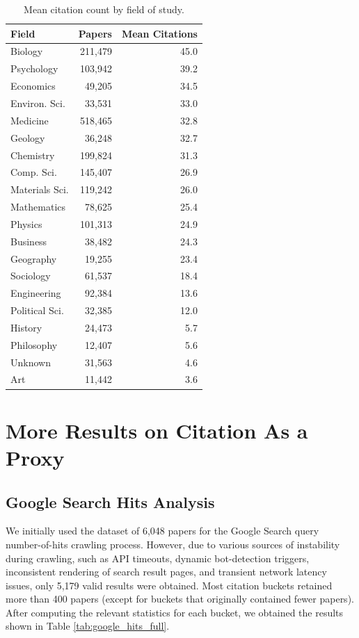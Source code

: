 \documentclass[11pt]{article}
\begin{document}
\begin{table}[htbp]
\centering

\begin{tabular}{@{}lrr@{}}
\toprule
\textbf{Field} & \textbf{Papers} & \textbf{Mean Citations} \\
\midrule
Biology & 211,479 & 45.0 \\
Psychology & 103,942 & 39.2 \\
Economics & 49,205 & 34.5 \\
Environ. Sci. & 33,531 & 33.0 \\
Medicine & 518,465 & 32.8 \\
Geology & 36,248 & 32.7 \\
Chemistry & 199,824 & 31.3 \\
Comp. Sci. & 145,407 & 26.9 \\
Materials Sci. & 119,242 & 26.0 \\
Mathematics & 78,625 & 25.4 \\
Physics & 101,313 & 24.9 \\
Business & 38,482 & 24.3 \\
Geography & 19,255 & 23.4 \\
Sociology & 61,537 & 18.4 \\
Engineering & 92,384 & 13.6 \\
Political Sci. & 32,385 & 12.0 \\
History & 24,473 & 5.7 \\
Philosophy & 12,407 & 5.6 \\
Unknown & 31,563 & 4.6 \\
Art & 11,442 & 3.6 \\
\bottomrule
\end{tabular}
\caption{Mean citation count by field of study.}
\label{tab:citations-by-field-dist}
\end{table}

\section{More Results on Citation As a Proxy}

\subsection{Google Search Hits Analysis}
\label{sec:appendix_web_presence}

We initially used the dataset of 6,048 papers for the Google Search query number-of-hits crawling process. However, due to various sources of instability during crawling, such as API timeouts, dynamic bot-detection triggers, inconsistent rendering of search result pages, and transient network latency issues, only 5,179 valid results were obtained. Most citation buckets retained more than 400 papers (except for buckets that originally contained fewer papers). After computing the relevant statistics for each bucket, we obtained the results shown in Table \ref{tab:google_hits_full}.
\end{document}
